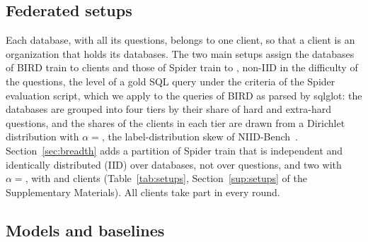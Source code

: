 \subsection{Federated setups}\label{sec:fed-setups}

Each database, with all its questions, belongs to one client, so that a
client is an organization that holds its databases. The two main setups
assign the databases of BIRD train to  clients and those
of Spider train to , non-IID in the
difficulty of the questions, the level of a gold SQL query under the
criteria of the Spider evaluation script, which we apply to the queries
of BIRD as parsed by sqlglot: the databases are grouped
into four tiers by their share of hard and extra-hard questions, and the
shares of the clients in each tier are drawn from a Dirichlet
distribution with $\alpha = {}$, the
label-distribution skew of NIID-Bench~\cite{li2022niidbench}.
Section~\ref{sec:breadth} adds a partition of Spider train that is independent and identically
distributed (IID) over databases, not over questions, and two with
$\alpha = {}$, with
 and
 clients (Table~\ref{tab:setups},
Section~\ref{sup:setups} of the Supplementary Materials). All clients
take part in every round.

\subsection{Models and baselines}\label{sec:models}\label{sec:baselines}

